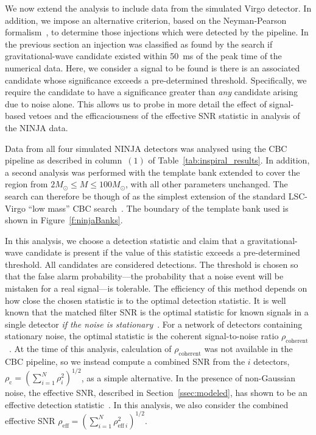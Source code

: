 We now extend the analysis to include data from the simulated Virgo
detector.  In addition, we impose an alternative criterion, based on
the Neyman-Pearson formalism~\cite{Helstrom:1968}, to determine those
injections which were detected by the pipeline.  In the previous
section an injection was classified as found by the search if
gravitational-wave candidate existed within 50~ms of the peak time of
the numerical data.  Here, we consider a signal to be found is there
is an associated candidate whose significance exceeds a pre-determined
threshold.  Specifically, we require the candidate to have a
significance greater than \textit{any} candidate arising due to noise
alone.  This allows us to probe in more detail the effect of
signal-based vetoes and the efficaciousness of the effective SNR
statistic in analysis of the NINJA data. 

Data from all four simulated NINJA detectors was analysed using the
CBC pipeline as described in column~$(1)$ of
Table~\ref{tab:inspiral_results}.  In addition, a second analysis was
performed with the template bank extended to cover the region from $2
M_\odot \le M \le 100 M_\odot$, with all other parameters unchanged.
The search can therefore be though of as the simplest extension of the
standard LSC-Virgo ``low mass'' CBC search~\cite{Abbott:2009tt}. The
boundary of the template bank used is shown in
Figure~\ref{f:ninjaBanks}. 

In this analysis, we choose a detection statistic and claim that a
gravitational-wave candidate is present if the value of this statistic
exceeds a pre-determined threshold. All candidates are considered
detections. The threshold is chosen so that the false alarm
probability---the probability that a noise event will be mistaken for
a real signal---is tolerable.  The efficiency of this method depends
on how close the chosen statistic is to the optimal detection
statistic. It is well known that the matched filter SNR is the optimal
statistic for known signals in a single detector \emph{if the noise is
stationary}~\cite{Wainstein:1962,Helstrom:1968}.  For a network of
detectors containing stationary noise, the optimal statistic is the
coherent signal-to-noise ratio
$\rho_\mathrm{coherent}$~\cite{Bose:1999pj}. At the time of this
analysis, calculation of $\rho_\mathrm{coherent}$ was not available in
the CBC pipeline, so we instead compute a combined SNR from the $i$
detectors, $\rho_\mathrm{c} = ({\sum_{i=1}^N \rho_{i}^2})^{1/2}$, as a
simple alternative.  In the presence of non-Gaussian noise, the
effective SNR, described in Section~\ref{ssec:modeled}, has shown to
be an effective detection statistic~\cite{Abbott:2007xi}. In this
analysis, we also consider the combined effective SNR
$\rho_{\mathrm{eff}} = (\sum_{i=1}^N \rho_{\mathrm{eff}\ i}^2)^{1/2}$.

